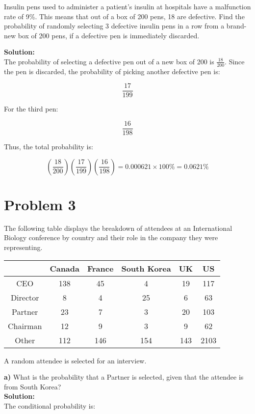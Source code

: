 \documentclass{article}
\begin{document}
Insulin pens used to administer a patient’s insulin at hospitals have a malfunction rate of 9\%. This means that out of a box of 200 pens, 18 are defective. Find the probability of randomly selecting 3 defective insulin pens in a row from a brand-new box of 200 pens, if a defective pen is immediately discarded.

\textbf{Solution:} \\
The probability of selecting a defective pen out of a new box of 200 is \( \frac{18}{200} \). Since the pen is discarded, the probability of picking another defective pen is:

\[
\frac{17}{199}
\]

For the third pen:

\[
\frac{16}{198}
\]

Thus, the total probability is:

\[
\left( \frac{18}{200} \right) \left( \frac{17}{199} \right) \left( \frac{16}{198} \right) = 0.000621 \times 100\% = 0.0621\%
\]

\section*{Problem 3}

The following table displays the breakdown of attendees at an International Biology conference by country and their role in the company they were representing.

\begin{tabular}{|c|c|c|c|c|c|}
\hline
& Canada & France & South Korea & UK  & US  \\
\hline
CEO      & 138    & 45     & 4           & 19  & 117 \\
Director & 8      & 4      & 25          & 6   & 63  \\
Partner  & 23     & 7      & 3           & 20  & 103 \\
Chairman & 12     & 9      & 3           & 9   & 62  \\
Other    & 112    & 146    & 154         & 143 & 2103 \\
\hline
\end{tabular}

A random attendee is selected for an interview.

\textbf{a)} What is the probability that a Partner is selected, given that the attendee is from South Korea?\\
\textbf{Solution:} \\
The conditional probability is:
\end{document}
